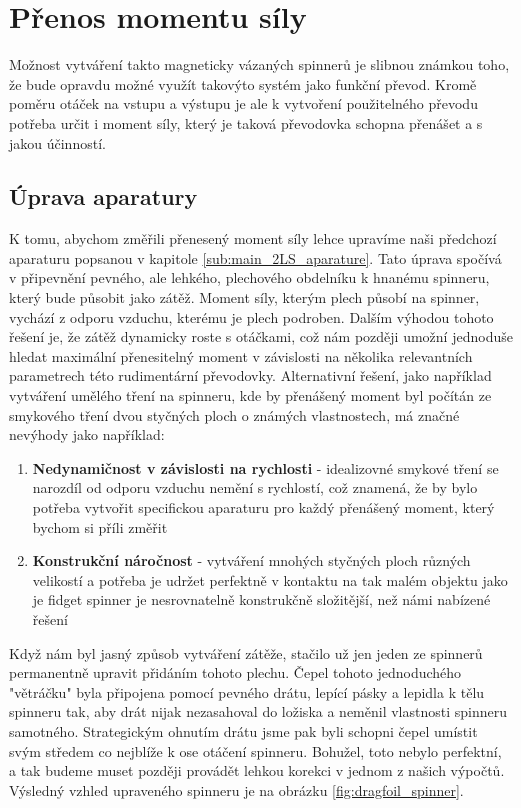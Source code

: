 \chapter{Přenos momentu síly}

Možnost vytváření takto magneticky vázaných spinnerů je slibnou známkou toho, že bude opravdu možné využít takovýto systém jako funkční převod. Kromě poměru otáček na vstupu a výstupu je ale k vytvoření použitelného převodu potřeba určit i moment síly, který je taková převodovka schopna přenášet a s jakou účinností.

\section{Úprava aparatury}

K tomu, abychom změřili přenesený moment síly lehce upravíme naši předchozí aparaturu popsanou v kapitole \ref{sub:main_2LS_aparature}. Tato úprava spočívá v připevnění pevného, ale lehkého, plechového obdelníku k hnanému spinneru, který bude působit jako zátěž. Moment síly, kterým plech působí na spinner, vychází z odporu vzduchu, kterému je plech podroben. Dalším výhodou tohoto řešení je, že zátěž dynamicky roste s otáčkami, což nám později umožní jednoduše hledat maximální přenesitelný moment v závislosti na několika relevantních parametrech této rudimentární převodovky. Alternativní řešení, jako například vytváření umělého tření na spinneru, kde by přenášený moment byl počítán ze smykového tření dvou styčných ploch o známých vlastnostech, má značné nevýhody jako například: 

\begin{enumerate}[topsep=0pt, partopsep=0pt]
    \setlength{\itemsep}{0pt}%
    \setlength{\parskip}{0pt}%
    \item \textbf{Nedynamičnost v závislosti na rychlosti} - idealizovné smykové tření se narozdíl od odporu vzduchu nemění s rychlostí, což znamená, že by bylo potřeba vytvořit specifickou aparaturu pro každý přenášený moment, který bychom si příli změřit
    \item \textbf{Konstrukční náročnost} - vytváření mnohých styčných ploch různých velikostí a potřeba je udržet perfektně v kontaktu na tak malém objektu jako je fidget spinner je nesrovnatelně konstrukčně složitější, než námi nabízené řešení
\end{enumerate}

Když nám byl jasný způsob vytváření zátěže, stačilo už jen jeden ze spinnerů permanentně upravit přidáním tohoto plechu. Čepel tohoto jednoduchého "větráčku" byla připojena pomocí pevného drátu, lepící pásky a lepidla k tělu spinneru tak, aby drát nijak nezasahoval do ložiska a neměnil vlastnosti spinneru samotného. Strategickým ohnutím drátu jsme pak byli schopni čepel umístit svým středem co nejblíže k ose otáčení spinneru. Bohužel, toto nebylo perfektní, a tak budeme muset později provádět lehkou korekci v jednom z našich výpočtů.
Výsledný vzhled upraveného spinneru je na obrázku \ref{fig:dragfoil_spinner}.

